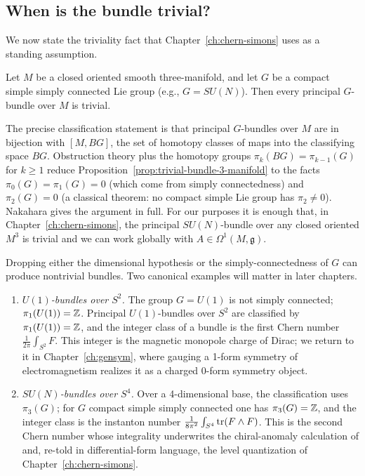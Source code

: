 \subsection{When is the bundle trivial?}

We now state the triviality fact that Chapter~\ref{ch:chern-simons} uses as a standing assumption.

\begin{proposition}\label{prop:trivial-bundle-3-manifold}
Let $M$ be a closed oriented smooth three-manifold, and let $G$ be a compact simple simply connected Lie group (e.g., $G = SU(N)$). Then every principal $G$-bundle over $M$ is trivial.
\end{proposition}

The precise classification statement is that principal $G$-bundles over $M$ are in bijection with $[M, BG]$, the set of homotopy classes of maps into the classifying space $BG$. Obstruction theory plus the homotopy groups $\pi_k(BG) = \pi_{k-1}(G)$ for $k \geq 1$ reduce Proposition~\ref{prop:trivial-bundle-3-manifold} to the facts $\pi_0(G) = \pi_1(G) = 0$ (which come from simply connectedness) and $\pi_2(G) = 0$ (a classical theorem: no compact simple Lie group has $\pi_2 \neq 0$). Nakahara \cite{Nakahara2003GTP} gives the argument in full. For our purposes it is enough that, in Chapter~\ref{ch:chern-simons}, the principal $SU(N)$-bundle over any closed oriented $M^3$ is trivial and we can work globally with $A \in \Omega^1(M, \mathfrak{g})$.

\begin{remark}\label{rem:when-triviality-fails}
Dropping either the dimensional hypothesis or the simply-connectedness of $G$ can produce nontrivial bundles. Two canonical examples will matter in later chapters.
\begin{enumerate}
\item \emph{$U(1)$-bundles over $S^2$.} The group $G = U(1)$ is not simply connected; $\pi_1(U(1)) = \mathbb{Z}$. Principal $U(1)$-bundles over $S^2$ are classified by $\pi_1(U(1)) = \mathbb{Z}$, and the integer class of a bundle is the first Chern number $\frac{1}{2\pi}\int_{S^2} F$. This integer is the magnetic monopole charge of Dirac; we return to it in Chapter~\ref{ch:gensym}, where gauging a 1-form symmetry of electromagnetism realizes it as a charged 0-form symmetry object.
\item \emph{$SU(N)$-bundles over $S^4$.} Over a 4-dimensional base, the classification uses $\pi_3(G)$; for $G$ compact simple simply connected one has $\pi_3(G) = \mathbb{Z}$, and the integer class is the instanton number $\frac{1}{8\pi^2}\int_{S^4} \operatorname{tr}(F \wedge F)$. This is the second Chern number whose integrality underwrites the chiral-anomaly calculation of \cite[Ch.~30]{Schwartz2014QFT} and, re-told in differential-form language, the level quantization of Chapter~\ref{ch:chern-simons}.
\end{enumerate}
\end{remark}

